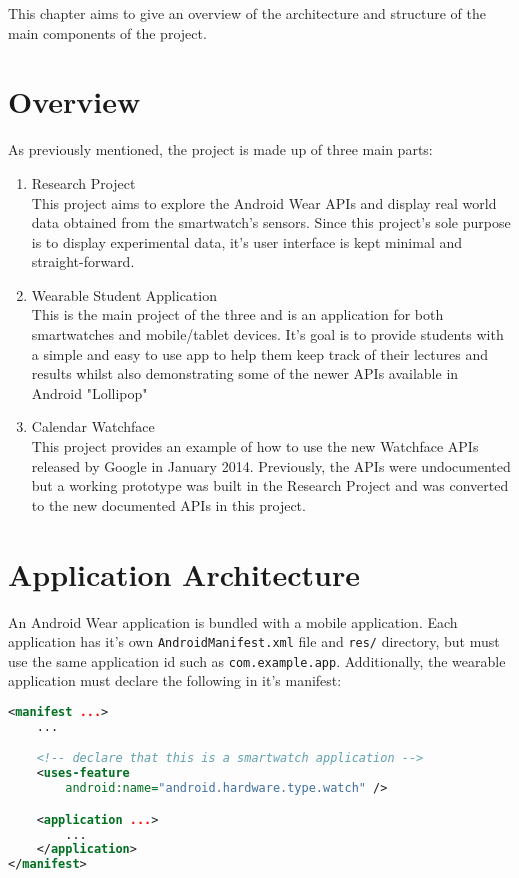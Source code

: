 This chapter aims to give an overview of the architecture and structure of the
main components of the project.

\section{Overview}
As previously mentioned, the project is made up of three main parts:
\begin{enumerate}
\item Research Project\\
This project aims to explore the Android Wear APIs and display real world data
obtained from the smartwatch's sensors. Since this project's sole purpose is to
display experimental data, it's user interface is kept minimal and
straight-forward.
\item Wearable Student Application\\
This is the main project of the three and is an application for both
smartwatches and mobile/tablet devices. It's goal is to provide students with
a simple and easy to use app to help them keep track of their lectures and
results whilst also demonstrating some of the newer APIs available in Android
"Lollipop"
\item Calendar Watchface\\
This project provides an example of how to use the new Watchface APIs released
by Google in January 2014. Previously, the APIs were undocumented but a working
prototype was built in the Research Project and was converted to the new
documented APIs in this project.

\end{enumerate}

\section{Application Architecture}
An Android Wear application is bundled with a mobile application. Each
application has it's own \texttt{AndroidManifest.xml} file and
\texttt{res/} directory, but must use the same application id such as
\texttt{com.example.app}. Additionally, the wearable application must declare
the following in it's manifest:
\begin{lstlisting}[language=XML]
<manifest ...>
    ...

    <!-- declare that this is a smartwatch application -->
    <uses-feature
        android:name="android.hardware.type.watch" />

    <application ...>
        ...
    </application>
</manifest>
\end{lstlisting}

